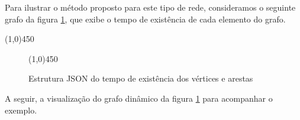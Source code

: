 Para ilustrar o método proposto para este tipo de rede, consideramos o seguinte grafo da figura \ref{fig:datatime}, que
exibe o tempo de existência de cada elemento do grafo.

\begin{center}
  \line(1,0){450}
\end{center}

\begin{figure}[htbp]
  \begin{center}
    \line(1,0){450}
  \end{center}
  \centering
  \caption{Estrutura JSON do tempo de existência dos vértices e arestas}
  \label{fig:datatime}
\end{figure}
\FloatBarrier

A seguir, a visualização do grafo dinâmico da figura \ref{fig:datatime} para acompanhar o exemplo.

